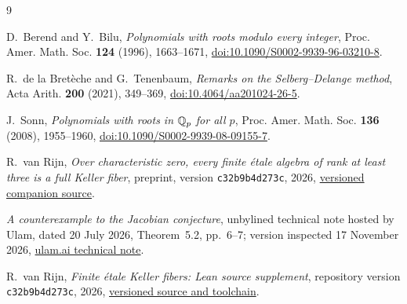 \begin{thebibliography}{9}
\footnotesize
\setlength{\itemsep}{0pt}

D.~Berend and Y.~Bilu,
\emph{Polynomials with roots modulo every integer},
Proc. Amer. Math. Soc. \textbf{124} (1996), 1663--1671,
\href{https://doi.org/10.1090/S0002-9939-96-03210-8}
{doi:10.1090/S0002-9939-96-03210-8}.

R.~de la Bret\`eche and G.~Tenenbaum,
\emph{Remarks on the Selberg--Delange method},
Acta Arith. \textbf{200} (2021), 349--369,
\href{https://doi.org/10.4064/aa201024-26-5}
{doi:10.4064/aa201024-26-5}.

J.~Sonn,
\emph{Polynomials with roots in \(\mathbb Q_p\) for all \(p\)},
Proc. Amer. Math. Soc. \textbf{136} (2008), 1955--1960,
\href{https://doi.org/10.1090/S0002-9939-08-09155-7}
{doi:10.1090/S0002-9939-08-09155-7}.

R.~van Rijn,
\emph{Over characteristic zero, every finite \'etale algebra of rank at
least three is a full Keller fiber},
preprint, version \texttt{c32b9b4d273c}, 2026,
\href{https://github.com/royvanrijn/jacobian-research/tree/c32b9b4d273cf7988e85184a0d5eae9c488727fd/unpublished/common-arithmetic-fibers}{versioned companion source}.

\emph{A counterexample to the Jacobian conjecture},
unbylined technical note hosted by Ulam, dated 20 July 2026,
Theorem~5.2, pp.~6--7; version inspected 17 November 2026,
\href{https://www.ulam.ai/research/jacobian.pdf}{ulam.ai technical note}.

R.~van Rijn,
\emph{Finite \'etale Keller fibers: Lean source supplement},
repository version \texttt{c32b9b4d273c}, 2026,
\href{https://github.com/royvanrijn/jacobian-research/tree/c32b9b4d273cf7988e85184a0d5eae9c488727fd/research/foundations/formal/finite-etale-keller}
{versioned source and toolchain}.

\end{thebibliography}
